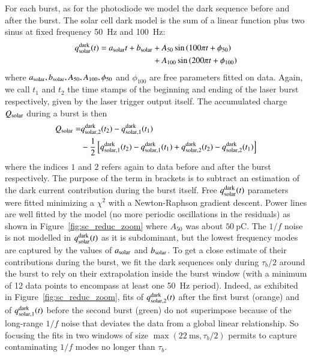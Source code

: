 For each burst, as for the photodiode we model the dark sequence before and after the burst. The solar cell dark model is the sum of a linear function plus two sinus at fixed frequency \SI{50}{\hertz} and \SI{100}{\hertz}:
\begin{align}
    q_{\rm solar}^{\rm dark}(t) = a_{\rm solar}t + b_{\rm solar} & + A_{50} \sin \left( 100 \pi t + \phi_{50}\right)  \notag \\  & +  A_{100} \sin \left( 200 \pi t + \phi_{100}\right)
\end{align}
where $a_{\rm solar}, b_{\rm solar}, A_{50}, A_{100}, \phi_{50}$ and $\phi_{100}$ are free parameters fitted on data. 
Again, we call $t_1$ and $t_2$ the time stamps of the beginning and ending of the laser burst respectively, given by the laser trigger output itself.
The accumulated charge $Q_{\mathrm{solar}}$ during a burst is then
\begin{align}\label{eq:qsolar}
Q_{\mathrm{solar}}  = & q_{\rm solar,2}^{\rm dark}(t_2) - q_{\rm solar, 1}^{\rm dark}(t_1) \\  &  - \frac{1}{2} \left[q_{\rm solar,1}^{\rm dark}(t_2) - q_{\rm solar,1}^{\rm dark}(t_1) + q_{\rm solar,2}^{\rm dark}(t_2) - q_{\rm solar,2}^{\rm dark}(t_1)  \right]    \notag
\end{align}
where the indices $1$ and $2$ refers again to data before and after the burst respectively. The purpose of the term in brackets is to subtract an estimation of the dark current contribution during the burst itself. Free $q_{\rm solar}^{\rm dark}(t)$ parameters were fitted minimizing a $\chi^2$ with a Newton-Raphson gradient descent. Power lines are well fitted by the model (no more periodic oscillations in the residuals) as shown in Figure~\ref{fig:sc_reduc_zoom} where $A_{50}$ was about $\SI{50}{\pico\coulomb}$.
The $1/f$ noise is not modelled in $q_{\rm solar}^{\rm dark}(t)$ as it is subdominant, but the lowest frequency modes are captured by the values of $a_{\rm solar}$ and $b_{\rm solar}$. To get a close estimate of their contributions during the burst, we fit the dark sequences only during $\tau_b/2$ around the burst to rely on their extrapolation inside the burst window (with a minimum of 12 data points to encompass at least one \SI{50}{\hertz} period). %
Indeed, as exhibited in Figure~\ref{fig:sc_reduc_zoom}, fits of $q_{\rm solar,2}^{\rm dark}(t)$ after the first burst (orange) and of $q_{\rm solar,1}^{\rm dark}(t)$ before the second burst (green) do not superimpose because of the long-range $1/f$ noise that deviates the data from a global linear relationship. So focusing the fits in two windows of size $\max(\SI{22}{\ms},\tau_b/2)$ permits to capture contaminating $1/f$ modes no longer than $\tau_b$. 

